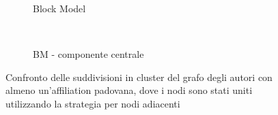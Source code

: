 \documentclass[12pt,a4paper,twoside]{report}
\begin{document}
\begin{figure}[ht]
\begin{subfigure}[b]{0.5\textwidth}
            \caption{Block Model}
        \end{subfigure}%
        ~
        \begin{subfigure}[b]{0.5\textwidth}
            \centering
            \setlength{\fboxrule}{0pt} %
            \caption{BM - componente centrale}
        \end{subfigure}%
    \caption{Confronto delle suddivisioni in cluster del grafo degli autori con almeno un'affiliation
    padovana, dove i nodi sono stati uniti utilizzando la strategia per nodi adiacenti}
    \label{fig:grafipadovaniedge}
\end{figure}
\end{document}
